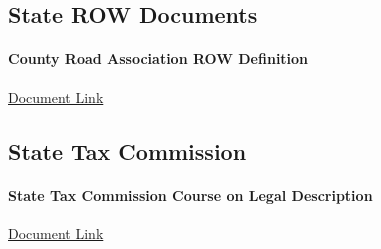 


\subsection{State ROW Documents}
\paragraph[CRA ROW Definition]{County Road Association ROW Definition}
\href{../../documentation/readingRoom/stateResources/CRA_RightofWay_GuideDoc_Updated.pdf}{Document Link}

\subsection{State Tax Commission}
\paragraph[STC Legal Description Course]{State Tax Commission Course on Legal Description}
\href{../../documentation/readingRoom/stateResources/State_Tax_Commission_Legal_Descriptions_Course_346936_7.pdf}{Document Link}



